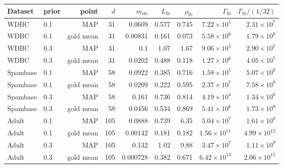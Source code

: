 \begin{tabular}{llrrrrrrr}
\toprule
Dataset & prior & point & $d$ & $m_{\mathrm{ub}}$ & $L_{\mathrm{lb}}$ & $\rho_{\mathrm{lb}}$ & $\Gamma_{\mathrm{lb}}$ & $\Gamma_{\mathrm{lb}}/(1/32)$ \\
\midrule
WDBC & 0.1 & MAP & 31 & 0.0609 & 0.577 & 0.745 & $7.22\times10^{5}$ & $2.31\times10^{7}$ \\
WDBC & 0.1 & gold mean & 31 & 0.00831 & 0.161 & 0.073 & $5.58\times10^{6}$ & $1.79\times10^{8}$ \\
WDBC & 0.3 & MAP & 31 & 0.1 & 1.07 & 1.67 & $9.06\times10^{5}$ & $2.90\times10^{7}$ \\
WDBC & 0.3 & gold mean & 31 & 0.0202 & 0.488 & 0.118 & $1.27\times10^{6}$ & $4.05\times10^{7}$ \\
Spambase & 0.1 & MAP & 58 & 0.0922 & 0.385 & 0.716 & $1.58\times10^{5}$ & $5.07\times10^{6}$ \\
Spambase & 0.1 & gold mean & 58 & 0.0209 & 0.222 & 0.595 & $2.37\times10^{7}$ & $7.58\times10^{8}$ \\
Spambase & 0.3 & MAP & 58 & 0.161 & 0.736 & 0.814 & $4.19\times10^{4}$ & $1.34\times10^{6}$ \\
Spambase & 0.3 & gold mean & 58 & 0.0456 & 0.534 & 0.869 & $5.41\times10^{6}$ & $1.73\times10^{8}$ \\
Adult & 0.1 & MAP & 105 & 0.0888 & 0.739 & 6.35 & $5.04\times10^{7}$ & $1.61\times10^{9}$ \\
Adult & 0.1 & gold mean & 105 & 0.00142 & 0.181 & 0.182 & $1.56\times10^{11}$ & $4.99\times10^{12}$ \\
Adult & 0.3 & MAP & 105 & 0.132 & 1.02 & 9.88 & $3.47\times10^{7}$ & $1.11\times10^{9}$ \\
Adult & 0.3 & gold mean & 105 & 0.000728 & 0.382 & 0.671 & $6.42\times10^{13}$ & $2.06\times10^{15}$ \\
\bottomrule
\end{tabular}
